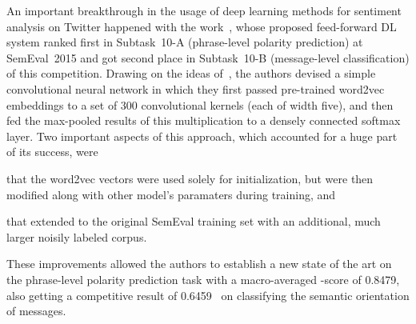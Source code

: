 An important breakthrough in the usage of deep learning methods for
sentiment analysis on Twitter happened with the
work~\citet{Severyn:15}, whose proposed feed-forward DL system ranked
first in Subtask~10-A (phrase-level polarity prediction) at
SemEval~2015 \cite{Rosenthal:15} and got second place in Subtask~10-B
(message-level classification) of this competition.  Drawing on the
ideas of~\citet{Kalchbrenner:14}, the authors devised a simple
convolutional neural network in which they first passed pre-trained
word2vec embeddings to a set of 300 convolutional kernels (each of
width five), and then fed the max-pooled results of this
multiplication to a densely connected softmax layer.  Two important
aspects of this approach, which accounted for a huge part of its
success, were
\begin{inparaenum}[(i)]
\item that the word2vec vectors were used solely for initialization,
  but were then modified along with other model's paramaters during
  training, and
\item that \citeauthor{Severyn:15} extended to the original SemEval
  training set with an additional, much larger noisily labeled corpus.
\end{inparaenum}
These improvements allowed the authors to establish a new state of the
art on the phrase-level polarity prediction task with a macro-averaged
\F-score of 0.8479, also getting a competitive result of 0.6459~\F{}
on classifying the semantic orientation of messages.

\todo[inline]{}

